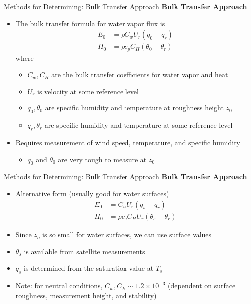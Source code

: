 \begin{frame}{Methods for Determining: Bulk Transfer Approach}
\textbf{Bulk Transfer Approach}
\begin{itemize}
	\item The bulk transfer formula for water vapor flux is
	\begin{align*}
	E_0 &= \rho C_w U_r (q_0 - q_r)\\
	H_0 &= \rho c_p C_H (\theta_0 - \theta_r)
	\end{align*}
	where
	\begin{itemize}
		\item $C_w, C_H$ are the bulk transfer coefficients for water vapor and heat
		\item $U_r$ is velocity at some reference level
		\item $q_0, \theta_0$ are specific humidity and temperature at roughness height $z_0$
		\item $q_r, \theta_r$ are specific humidity and temperature at some reference level
	\end{itemize}
	\item Requires measurement of wind speed, temperature, and specific humidity
	\begin{itemize}
		\item $q_0$ and $\theta_0$ are very tough to measure at $z_0$
	\end{itemize}
\end{itemize}
\end{frame}


\begin{frame}{Methods for Determining: Bulk Transfer Approach}
\textbf{Bulk Transfer Approach}
\begin{itemize}
	\item Alternative form (usually good for water surfaces)
	\begin{align*}
	E_0 &= C_w U_r (q_s - q_r)\\
	H_0 &= \rho c_p C_H U_r (\theta_s-\theta_r)
	\end{align*}
	\item Since $z_o$ is so small for water surfaces, we can use surface values
	\item $\theta_s$ is available from satellite measurements
	\item $q_s$ is determined from the saturation value at $T_s$
	\item Note: for neutral conditions, $C_w, C_H\sim 1.2\times 10^{-3}$ (dependent on surface roughness, measurement height, and stability)
\end{itemize}
\end{frame}


